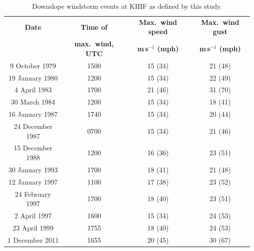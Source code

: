 \documentclass[pdftex,12pt]{article}
\def\mps{m\,s$^{-1}$}
\begin{document}
\begin{table}[t]
\caption{Downslope windstorm events at KHIF as defined by this study.}
\label{tab:dsws}
\begin{center}
\begin{tabular}{cccc}
\hline \hline   
\textbf{Date} & \textbf{Time of} & \textbf{Max.~wind speed} & \textbf{Max.~wind gust} \\
& \textbf{max.~wind, UTC} & \textbf{\mps{} (mph)} & \textbf{\mps{} (mph)} \\ \hline
{9 October 1979} & 1500 & 15 (34) & 21 (48) \\ 
{19 January 1980} & 1200 & 15 (34) & 22 (49) \\ 
{4 April 1983} & 1700 & 21 (46) & 31 (70) \\ 
{30 March 1984} & 1200 & 15 (34) & 18 (41) \\ 
{16 January 1987} & 1740 & 15 (34) & 20 (44) \\ 
{24 December 1987} & 0700 & 15 (34) & 21 (46) \\ 
{15 December 1988} & 1200 & 16 (36) & 23 (51) \\ 
{30 January 1993} & 1700 & 18 (41) & 21 (48) \\ 
{12 January 1997} & 1100 & 17 (38) & 23 (52) \\ 
{24 February 1997} & 1700 & 18 (40) & 23 (51) \\ 
{2 April 1997} & 1600 & 15 (34) & 24 (53) \\ 
{23 April 1999} & 1755 & 18 (40) & 24 (53) \\ 
{1 December 2011} & 1655 & 20 (45) & 30 (67) \\ 
\hline
\end{tabular}
\end{center}
\end{table}

%
\end{document}
